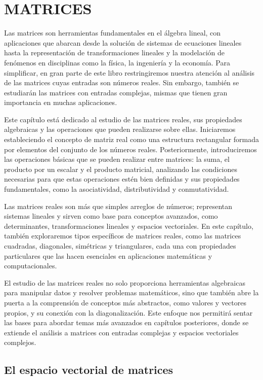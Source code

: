 \chapter{MATRICES}\label{chap:matrices}

Las matrices son herramientas fundamentales en el álgebra lineal, con aplicaciones que abarcan desde la solución de sistemas de ecuaciones lineales hasta la representación de transformaciones lineales y la modelación de fenómenos en disciplinas como la física, la ingeniería y la economía. Para simplificar, en gran parte de este libro restringiremos nuestra atención al análisis de las matrices cuyas entradas son números reales. Sin embargo, también se estudiarán las matrices con entradas complejas, mismas que tienen gran importancia en muchas aplicaciones.

Este capítulo está dedicado al estudio de las matrices reales, sus propiedades algebraicas y las operaciones que pueden realizarse sobre ellas. Iniciaremos estableciendo el concepto de matriz real como una estructura rectangular formada por elementos del conjunto de los números reales. Posteriormente, introduciremos las operaciones básicas que se pueden realizar entre matrices: la suma, el producto por un escalar y el producto matricial, analizando las condiciones necesarias para que estas operaciones estén bien definidas y sus propiedades fundamentales, como la asociatividad, distributividad y conmutatividad.

Las matrices reales son más que simples arreglos de números; representan sistemas lineales y sirven como base para conceptos avanzados, como determinantes, transformaciones lineales y espacios vectoriales. En este capítulo, también exploraremos tipos específicos de matrices reales, como las matrices cuadradas, diagonales, simétricas y triangulares, cada una con propiedades particulares que las hacen esenciales en aplicaciones matemáticas y computacionales.

El estudio de las matrices reales no solo proporciona herramientas algebraicas para manipular datos y resolver problemas matemáticos, sino que también abre la puerta a la comprensión de conceptos más abstractos, como valores y vectores propios, y su conexión con la diagonalización. Este enfoque nos permitirá sentar las bases para abordar temas más avanzados en capítulos posteriores, donde se extiende el análisis a matrices con entradas complejas y espacios vectoriales complejos.

\newpage

\section{El espacio vectorial de matrices}

